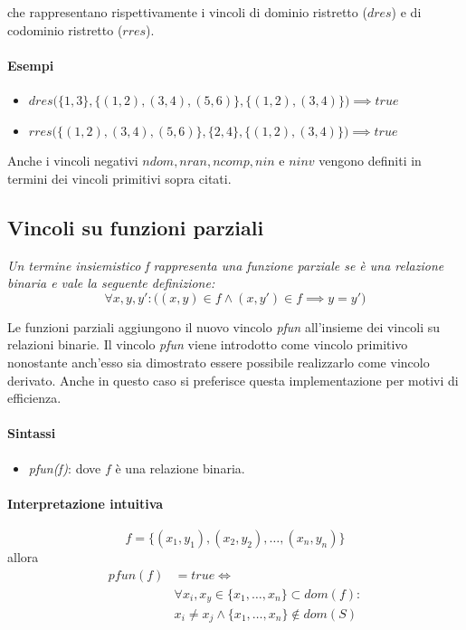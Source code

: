 \documentclass[12pt,a4paper,openright]{book} %
\begin{document}
che rappresentano rispettivamente i vincoli di dominio ristretto ($dres$) e di codominio ristretto ($rres$).

\paragraph{Esempi}
\begin{itemize}
\item $dres\big(\{1,3\}, \{(1,2), (3,4), (5,6)\}, \{(1,2), (3,4)\}\big) \implies true$
\item $rres\big(\{(1,2), (3,4), (5,6)\}, \{2,4\}, \{(1,2), (3,4)\}\big) \implies true$
\end{itemize}

Anche i vincoli negativi $ndom, nran, ncomp, nin$ e $ninv$ vengono definiti in termini dei vincoli primitivi sopra citati.

\subsection{Vincoli su funzioni parziali}
\label{sec:lang_lbr_pfun}

\textit{Un termine insiemistico f rappresenta una funzione parziale se è una relazione binaria e vale la seguente definizione:}
\[
\forall x, y, y' : \big((x, y) \in f \wedge (x, y' ) \in f \implies y = y' \big)
\]

Le funzioni parziali aggiungono il nuovo vincolo \textit{pfun} all'insieme dei vincoli su relazioni binarie.
Il vincolo \textit{pfun} viene introdotto come vincolo primitivo nonostante anch'esso sia dimostrato essere possibile realizzarlo come vincolo derivato. Anche in questo caso si preferisce questa implementazione per motivi di efficienza.

\paragraph{Sintassi}
\begin{itemize}
\item \textit{pfun(f)}: dove $f$ è una relazione binaria.
\end{itemize}

\paragraph{Interpretazione intuitiva}
\[
f = \{ (x_1, y_1), (x_2, y_2), \ldots, (x_n, y_n) \}
\]
allora
\begin{align*}
pfun(f) & = true \Longleftrightarrow \\
  & \forall x_i, x_y \in \{ x_1, \ldots, x_n \} \subset dom(f): \\
    & x_i \neq x_j \land \{ x_1, \ldots, x_n \} \not\in dom(S)
\end{align*}
\end{document}
